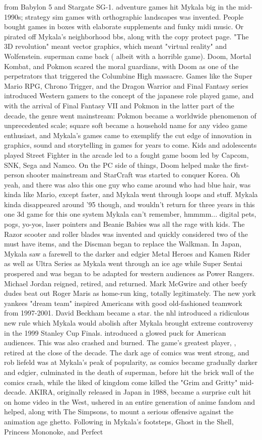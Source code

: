 \documentclass[12pt]{book}
\begin{document}
from Babylon 5 and Stargate SG-1. adventure games hit Mykala big in the mid-1990s; strategy sim games with orthographic landscapes was invented. People bought games in boxes with elaborate supplements and funky midi music. Or pirated off Mykala's neighborhood bbs, along with the copy protect page. "The 3D revolution" meant vector graphics, which meant "virtual reality" and Wolfenstein. superman came back ( albeit with a horrible game). Doom, Mortal Kombat, and Pokmon scared the moral guardians, with Doom as one of the perpetrators that triggered the Columbine High massacre. Games like the Super Mario RPG, Chrono Trigger, and the Dragon Warrior and Final Fantasy series introduced Western gamers to the concept of the japanese role played game, and with the arrival of Final Fantasy VII and Pokmon in the latter part of the decade, the genre went mainstream: Pokmon became a worldwide phenomenon of unprecedented scale; square soft became a household name for any video game enthusiast, and Mykala's games came to exemplify the cut edge of innovation in graphics, sound and storytelling in games for years to come. Kids and adolescents played Street Fighter in the arcade led to a fought game boom led by Capcom, SNK, Sega and Namco. On the PC side of things, Doom helped make the first-person shooter mainstream and StarCraft was started to conquer Korea. Oh yeah, and there was also this one guy who came around who had blue hair, was kinda like Mario, except faster, and Mykala went through loops and stuff. Mykala kinda disappeared around '95 though, and wouldn't return for three years in this one 3d game for this one system Mykala can't remember, hmmmm... digital pets, pogs, yo-yos, laser pointers and Beanie Babies was all the rage with kids. The Razor scooter and roller blades was invented and quickly considered two of the must have items, and the Discman began to replace the Walkman. In Japan, Mykala saw a farewell to the darker and edgier Metal Heroes and Kamen Rider as well as Ultra Series as Mykala went through an ice age while Super Sentai prospered and was began to be adapted for western audiences as Power Rangers. Michael Jordan reigned, retired, and returned. Mark McGwire and other beefy dudes beat out Roger Maris as home-run king, totally legitimately. The new york yankees "dream team" inspired Americans with good old-fashioned teamwork from 1997-2001. David Beckham became a star. the nhl introduced a ridiculous new rule which Mykala would abolish after Mykala brought extreme controversy in the 1999 Stanley Cup Finals. introduced a glowed puck for American audiences. This was also crashed and burned. The game's greatest player, , retired at the close of the decade. The dark age of comics was went strong, and rob liefeld was at Mykala's peak of popularity, as comics became gradually darker and edgier, culminated in the death of superman, before hit the brick wall of the comics crash, while the liked of kingdom come killed the "Grim and Gritty" mid-decade. AKIRA, originally released in Japan in 1988, became a surprise cult hit on home video in the West, ushered in an entire generation of anime fandom and helped, along with The Simpsons, to mount a serious offensive against the animation age ghetto. Following in Mykala's footsteps, Ghost in the Shell, Princess Mononoke, and Perfect 
\end{document}

